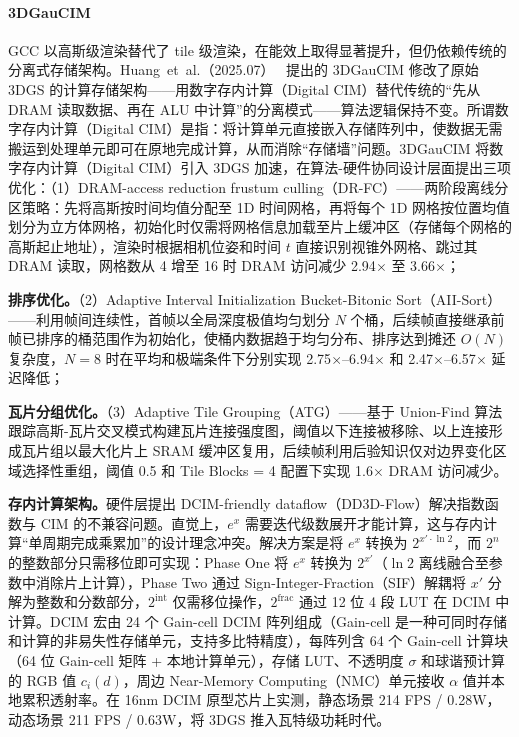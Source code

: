 \paragraph{3DGauCIM}
GCC 以高斯级渲染替代了 tile 级渲染，在能效上取得显著提升，但仍依赖传统的分离式存储架构。Huang~et~al.（2025.07）~\cite{2507_19133} 提出的 3DGauCIM 修改了原始 3DGS 的计算存储架构——用数字存内计算（Digital CIM）替代传统的“先从 DRAM 读取数据、再在 ALU 中计算”的分离模式——算法逻辑保持不变。所谓数字存内计算（Digital CIM）是指：将计算单元直接嵌入存储阵列中，使数据无需搬运到处理单元即可在原地完成计算，从而消除“存储墙”问题。3DGauCIM 将数字存内计算（Digital CIM）引入 3DGS 加速，在算法-硬件协同设计层面提出三项优化：（1）DRAM-access reduction frustum culling（DR-FC）——两阶段离线分区策略：先将高斯按时间均值分配至 1D 时间网格，再将每个 1D 网格按位置均值划分为立方体网格，初始化时仅需将网格信息加载至片上缓冲区（存储每个网格的高斯起止地址），渲染时根据相机位姿和时间 $t$ 直接识别视锥外网格、跳过其 DRAM 读取，网格数从 4 增至 16 时 DRAM 访问减少 2.94$\times$ 至 3.66$\times$；

\textbf{排序优化。}（2）Adaptive Interval Initialization Bucket-Bitonic Sort（AII-Sort）——利用帧间连续性，首帧以全局深度极值均匀划分 $N$ 个桶，后续帧直接继承前帧已排序的桶范围作为初始化，使桶内数据趋于均匀分布、排序达到摊还 $O(N)$ 复杂度，$N = 8$ 时在平均和极端条件下分别实现 2.75$\times$--6.94$\times$ 和 2.47$\times$--6.57$\times$ 延迟降低；

\textbf{瓦片分组优化。}（3）Adaptive Tile Grouping（ATG）——基于 Union-Find 算法跟踪高斯-瓦片交叉模式构建瓦片连接强度图，阈值以下连接被移除、以上连接形成瓦片组以最大化片上 SRAM 缓冲区复用，后续帧利用后验知识仅对边界变化区域选择性重组，阈值 0.5 和 Tile Blocks = 4 配置下实现 1.6$\times$ DRAM 访问减少。

\textbf{存内计算架构。}硬件层提出 DCIM-friendly dataflow（DD3D-Flow）解决指数函数与 CIM 的不兼容问题。直觉上，$e^x$ 需要迭代级数展开才能计算，这与存内计算“单周期完成乘累加”的设计理念冲突。解决方案是将 $e^x$ 转换为 $2^{x'\cdot\ln 2}$，而 $2^n$ 的整数部分只需移位即可实现：Phase One 将 $e^x$ 转换为 $2^{x'}$（$\ln 2$ 离线融合至参数中消除片上计算），Phase Two 通过 Sign-Integer-Fraction（SIF）解耦将 $x'$ 分解为整数和分数部分，$2^{\text{int}}$ 仅需移位操作，$2^{\text{frac}}$ 通过 12 位 4 段 LUT 在 DCIM 中计算。DCIM 宏由 24 个 Gain-cell DCIM 阵列组成（Gain-cell 是一种可同时存储和计算的非易失性存储单元，支持多比特精度），每阵列含 64 个 Gain-cell 计算块（64 位 Gain-cell 矩阵 + 本地计算单元），存储 LUT、不透明度 $\sigma$ 和球谐预计算的 RGB 值 $c_i(d)$，周边 Near-Memory Computing（NMC）单元接收 $\alpha$ 值并本地累积透射率。在 16nm DCIM 原型芯片上实测，静态场景 214 FPS / 0.28W，动态场景 211 FPS / 0.63W，将 3DGS 推入瓦特级功耗时代。


